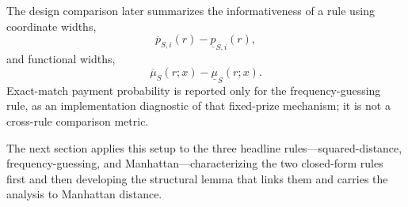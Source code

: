 The design comparison later summarizes the informativeness of a rule using coordinate widths,
\[
\overline p_{S,i}(r)-\underline p_{S,i}(r),
\]
and functional widths,
\[
\overline\mu_S(r;x)-\underline\mu_S(r;x).
\]
Exact-match payment probability is reported only for the frequency-guessing rule, as an implementation diagnostic of that fixed-prize mechanism; it is not a cross-rule comparison metric.

The next section applies this setup to the three headline rules---squared-distance, frequency-guessing, and Manhattan---characterizing the two closed-form rules first and then developing the structural lemma that links them and carries the analysis to Manhattan distance.
